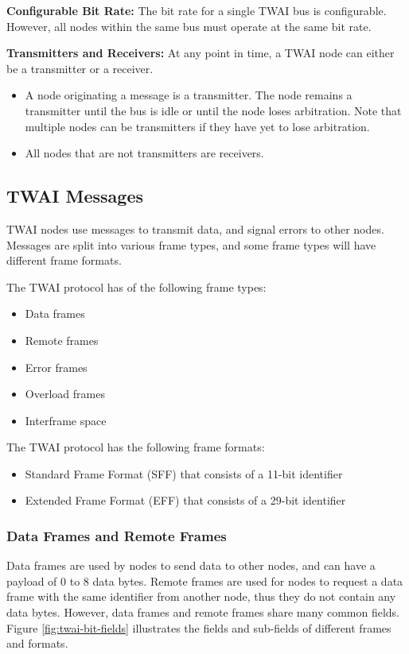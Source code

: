 \documentclass[main\_\_EN.tex]{subfiles}
\begin{document}
{\bfseries
Configurable Bit Rate:} The bit rate for a single TWAI bus is configurable. However, all nodes within the same bus must operate at the same bit rate.

{\bfseries Transmitters and Receivers:} At any point in time, a TWAI node can either be a transmitter or a receiver.
\begin{itemize}
    \item A node originating a message is a transmitter. The node remains a transmitter until the bus is idle or until the node loses arbitration. Note that multiple nodes can be transmitters if they have yet to lose arbitration.
    \item All nodes that are not transmitters are receivers.
\end{itemize}

\subsection{TWAI Messages}
\label{sec:twai-messages}

TWAI nodes use messages to transmit data, and signal errors to other nodes. Messages are split into various frame types, and some frame types will have different frame formats.

The TWAI protocol has of the following frame types:

\begin{itemize}
    \item Data frames
    \item Remote frames
    \item Error frames
    \item Overload frames
    \item Interframe space
\end{itemize}

The TWAI protocol has the following frame formats:

\begin{itemize}
    \item Standard Frame Format (SFF) that consists of a 11-bit identifier
    \item Extended Frame Format (EFF) that consists of a 29-bit identifier
\end{itemize}

\subsubsection{Data Frames and Remote Frames}

Data frames are used by nodes to send data to other nodes, and can have a payload of 0 to 8 data bytes. Remote frames are used for nodes to request a data frame with the same identifier from another node, thus they do not contain any data bytes. However, data frames and remote frames share many common fields. Figure \ref{fig:twai-bit-fields} illustrates the fields and sub-fields of different frames and formats.
\end{document}
